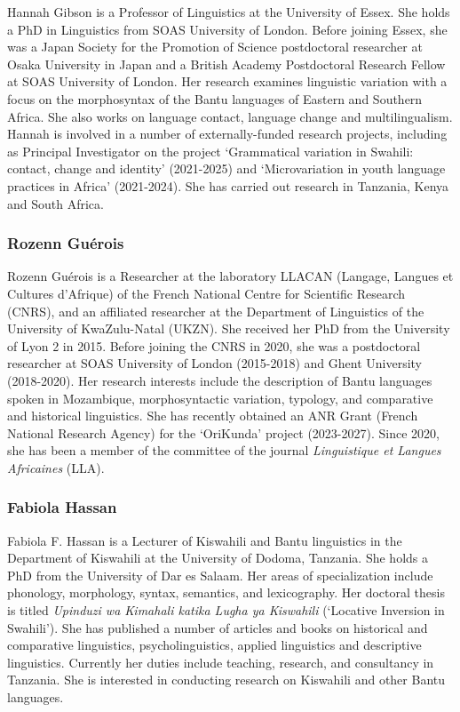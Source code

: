 Hannah Gibson is a Professor of Linguistics at the University of Essex. She holds a PhD in Linguistics from SOAS University of London. Before joining Essex, she was a Japan Society for the Promotion of Science postdoctoral researcher at Osaka University in Japan and a British Academy Postdoctoral Research Fellow at SOAS University of London. Her research examines linguistic variation with a focus on the morphosyntax of the Bantu languages of Eastern and Southern Africa. She also works on language contact, language change and multilingualism. Hannah is involved in a number of externally-funded research projects, including as Principal Investigator on the project ‘Grammatical variation in Swahili: contact, change and identity’ (2021-2025) and ‘Microvariation in youth language practices in Africa’ (2021-2024). She has carried out research in Tanzania, Kenya and South Africa.

\subsubsection*{Rozenn Guérois }
Rozenn Guérois is a Researcher at the laboratory LLACAN (Langage, Langues et Cultures d’Afrique) of the French National Centre for Scientific Research (CNRS), and an affiliated researcher at the Department of Linguistics of the University of KwaZulu-Natal (UKZN). She received her PhD from the University of Lyon 2 in 2015. Before joining the CNRS in 2020, she was a postdoctoral researcher at SOAS University of London (2015-2018) and Ghent University (2018-2020). Her research interests include the description of Bantu languages spoken in Mozambique, morphosyntactic variation, typology, and comparative and historical linguistics. She has recently obtained an ANR Grant (French National Research Agency) for the ‘OriKunda’ project (2023-2027). Since 2020, she has been a member of the committee of the journal \textit{Linguistique et Langues Africaines} (LLA).

\subsubsection*{Fabiola Hassan }
Fabiola F. Hassan is a Lecturer of Kiswahili and Bantu linguistics in the Department of Kiswahili at the University of Dodoma, Tanzania.  She holds a PhD from the University of Dar es Salaam. Her areas of specialization include phonology, morphology, syntax, semantics, and lexicography. Her doctoral thesis is titled \textit{Upinduzi wa Kimahali katika Lugha ya Kiswahili} (‘Locative Inversion in Swahili’). She has published a number of articles and books on historical and comparative linguistics, psycholinguistics, applied linguistics and descriptive linguistics. Currently her duties include teaching, research, and consultancy in Tanzania. She is interested in conducting research on Kiswahili and other Bantu languages.

